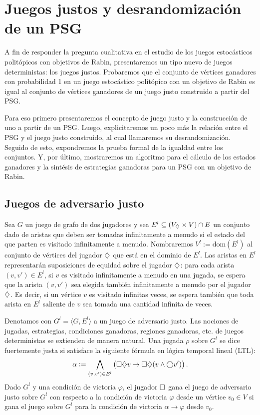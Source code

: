 \section{Juegos justos y desrandomización de un PSG}
\label{sec:prueba}

A fin de responder la pregunta cualitativa en el estudio de los juegos
estocásticos politópicos con objetivos de Rabin, presentaremos un tipo nuevo de
juegos deterministas: los juegos justos. Probaremos que el conjunto de vértices
ganadores con probabilidad 1 en un juego estocástico politópico con un objetivo
de Rabin es igual al conjunto de vértices ganadores de un juego justo
construido a partir del PSG.

Para eso primero presentaremos el concepto de juego justo y la construcción de
uno a partir de un PSG. Luego, explicitaremos un poco más la relación entre el
PSG y el juego justo construido, al cual llamaremos su desrandomización.
Seguido de esto, expondremos la prueba formal de la igualdad entre los
conjuntos. Y, por último, mostraremos un algoritmo para el cálculo de los
estados ganadores y la sintésis de estrategias ganadoras para un PSG con un
objetivo de Rabin. %

\subsection*{Juegos de adversario justo}

Sea $G$ un juego de grafo de dos jugadores y sea $E^{l} \subseteq (V_\diamondsuit
	\times V) \cap E$ un conjunto dado de aristas que deben ser tomadas
infinitamente a menudo si el estado del que parten es visitado infinitamente a
menudo. Nombraremos $V^{l} := \mathrm{dom}(E^{l})$ al conjunto de vértices del
jugador $\diamondsuit$ que está en el dominio de $E^{l}$. Las aristas en $E^{l}$
representarán suposiciones de equidad sobre el jugador $\diamondsuit$: para cada
arista $(v, v') \in E^{l}$, si $v$ es visitado infinitamente a menudo en una
jugada, se espera que la arista $(v, v')$ sea elegida también infinitamente a
menudo por el jugador $\diamondsuit$. Es decir, si un vértice $v$ es visitado
infinitas veces, se espera también que toda arista en $E^l$ saliente de $v$ sea
tomada una cantidad infinita de veces.

Denotamos con $G^{l} = \langle G, E^{l} \rangle$ a un juego de adversario
justo. Las nociones de jugadas, estrategias, condiciones ganadoras, regiones
ganadoras, etc. de juegos deterministas se extienden de manera natural. Una
jugada $\rho$ sobre $G^{l}$ se dice fuertemente justa si satisface la siguiente
fórmula en lógica temporal lineal (LTL):
\[
	\alpha := \bigwedge_{(v, v') \in E^{l}} \left( \square \diamondsuit v \rightarrow \square \diamondsuit (v \wedge \bigcirc v') \right).
\]
Dado $G^{l}$ y una condición de victoria $\varphi$, el jugador $\square$ gana el
juego de adversario justo sobre $G^{l}$ con respecto a la condición de victoria
$\varphi$ desde un vértice $v_0 \in V$ si gana el juego sobre $G^{l}$ para la
condición de victoria $\alpha \rightarrow \varphi$ desde $v_0$.


